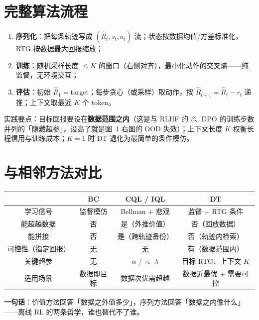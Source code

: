 \documentclass{article}
\begin{document}
\section*{完整算法流程}

\begin{enumerate}
  \item \textbf{序列化}：把每条轨迹写成 $(\hat R_t, s_t, a_t)$ 流；状态按数据均值/方差标准化，RTG 按数据最大回报缩放；
  \item \textbf{训练}：随机采样长度 $\le K$ 的窗口（右侧对齐），最小化动作的交叉熵——纯监督，无环境交互；
  \item \textbf{评估}：初始 $\hat R_1 = \text{target}$；每步贪心（或采样）取动作，按 $\hat R_{t+1} = \hat R_t - r_t$ 递推；上下文取最近 $K$ 个 token。
\end{enumerate}

实践要点：目标回报要设在\textbf{数据范围之内}（这是与 RLHF 的 $\beta$、DPO 的训练步数并列的「隐藏超参」，设高了就是图~1 右图的 OOD 失效）；上下文长度 $K$ 权衡长程信用与训练成本；$K=1$ 时 DT 退化为最简单的条件模仿。

\section*{与相邻方法对比}

\begin{center}
\begin{tabular}{c|c|c|c}
 & \textbf{BC} & \textbf{CQL / IQL} & \textbf{DT} \\
\hline
学习信号 & 监督模仿 & Bellman + 悲观 & 监督 + RTG 条件 \\
能超越数据 & 否 & 是（外推价值） & 否（回放数据） \\
能拼接 & 否 & 是（跨轨迹备份） & 否（轨迹内检索） \\
可控性（指定回报） & 无 & 无 & 有（数据范围内） \\
关键超参 & 无 & $\alpha$ / $\tau$、$\lambda$ & 目标 RTG、上下文 $K$ \\
适用场景 & 数据即目标 & 数据次优需超越 & 数据近最优 + 需要可控 \\
\end{tabular}
\end{center}

\textbf{一句话}：价值方法回答「数据之外值多少」，序列方法回答「数据之内像什么」——离线 RL 的两条哲学，谁也替代不了谁。
\end{document}
